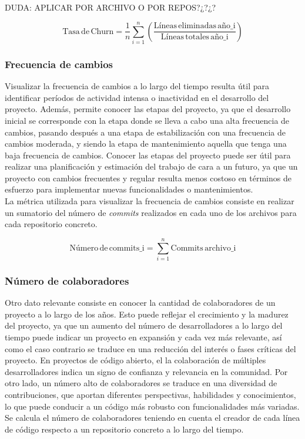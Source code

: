 \documentclass[a4paper, 12pt]{book}
\begin{document}
DUDA: APLICAR POR ARCHIVO O POR REPOS?¿?¿?

\[\text{Tasa} \, \text{de} \, \text{Churn} = \frac{1}{n} \sum_{i=1}^{n} \left( \frac{\text{Líneas} \, \text{eliminadas} \, \text{año_i}}{\text{Líneas} \, \text{totales} \, \text{año_i}} \right)\]

\subsubsection{Frecuencia de cambios}
\label{subsubsec:commits}

Visualizar la frecuencia de cambios a lo largo del tiempo resulta útil para identificar períodos de actividad intensa o inactividad en el desarrollo del proyecto. Además, permite conocer las etapas del proyecto, ya que el desarrollo
inicial se corresponde con la etapa donde se lleva a cabo una alta frecuencia de cambios, pasando después a una etapa de estabilización con una frecuencia de cambios moderada, y siendo la etapa de mantenimiento aquella que tenga una
baja frecuencia de cambios. Conocer las etapas del proyecto puede ser útil para realizar una planificación y estimación del trabajo de cara a un futuro, ya que un proyecto con cambios frecuentes y regular resulta menos costoso en
términos de esfuerzo para implementar nuevas funcionalidades o mantenimientos.
\\La métrica utilizada para visualizar la frecuencia de cambios consiste en realizar un sumatorio del número de \textit{commits} realizados en cada uno de los archivos para cada repositorio concreto.
 
\[\text{Número} \, \text{de} \, \text{commits_i} = \sum_{i=1}^{n} \text{Commits} \, \text{archivo_i}\]

\subsubsection{Número de colaboradores}
\label{subsubsec:numero-desarrolladores}

Otro dato relevante consiste en conocer la cantidad de colaboradores de un proyecto a lo largo de los años. Esto puede reflejar el crecimiento y la madurez del proyecto, ya que un aumento del número de desarrolladores
a lo largo del tiempo puede indicar un proyecto en expansión y cada vez más relevante, así como el caso contrario se traduce en una reducción del interés o fases críticas del proyecto. En proyectos de código 
abierto, el la colaboración de múltiples desarrolladores indica un signo de confianza y relevancia en la comunidad. Por otro lado, un número alto de colaboradores se traduce en una diversidad de contribuciones, que aportan
diferentes perspectivas, habilidades y conocimientos, lo que puede conducir a un código más robusto con funcionalidades más variadas.
\\Se calcula el número de colaboradores teniendo en cuenta el creador de cada línea de código respecto a un repositorio concreto a lo largo del tiempo.
\end{document}
